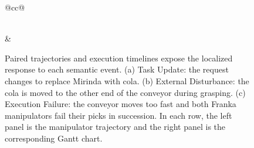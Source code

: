 \begin{figure}[t!]
\begin{tabular}{@{}cc@{}}
{\begin{tikzpicture}[baseline=(current bounding box.center),x=1in,y=1in]
        \rolechip{g4verline}{g4verfill}{Verification}{dependency invalidated}{.99,0}
        \rolechip{g4planline}{g4planfill}{Planning}{recover downstream branch}{1.98,0}
      \end{tikzpicture}} \\[-2pt]
    \noalign{\vspace{2pt}}
     &
     \\
  \end{tabular}

  \vspace{2pt}
  

  \caption{Paired trajectories and execution timelines expose the localized
  response to each semantic event. (a) Task Update: the request changes to replace Mirinda with
  cola. (b) External Disturbance: the cola is moved to the other end of the
  conveyor during grasping. (c) Execution Failure: the conveyor moves too fast
  and both Franka manipulators fail their picks in succession. In each row,
  the left panel is the manipulator trajectory and the right panel is the
  corresponding Gantt chart.}
  \label{fig:gantt}
\end{figure}
